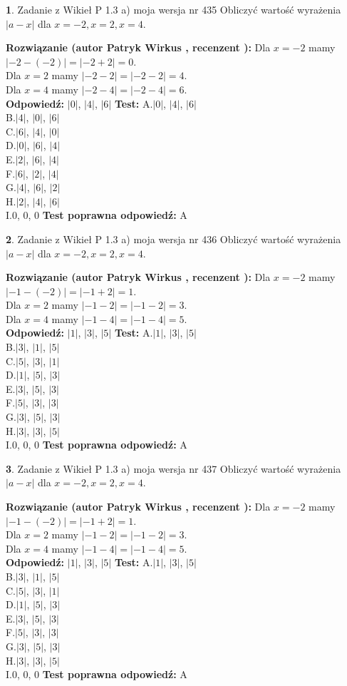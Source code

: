 \documentclass[12pt, a4paper]{article}
\theoremstyle{definition} %
\newtheorem{zad}{}
\newcommand{\zadStart}[1]{\begin{zad}#1\newline}
\newcommand{\zadStop}{\end{zad}}
\newcommand{\rozwStart}[2]{\noindent \textbf{Rozwiązanie (autor #1 , recenzent #2): }\newline}
\newcommand{\rozwStop}{\newline}
\newcommand{\odpStart}{\noindent \textbf{Odpowiedź:}\newline}
\newcommand{\odpStop}{\newline}
\newcommand{\testStart}{\noindent \textbf{Test:}\newline}
\newcommand{\testStop}{\newline}
\newcommand{\kluczStart}{\noindent \textbf{Test poprawna odpowiedź:}\newline}
\newcommand{\kluczStop}{\newline}
\begin{document}
\zadStart{Zadanie z Wikieł P 1.3 a) moja wersja nr 435}
Obliczyć wartość wyrażenia $|a - x|$ dla $x=-2,x=2,x=4$.
\zadStop
\rozwStart{Patryk Wirkus}{}
Dla $x = -2$ mamy $|-2 - (-2)| = |-2 + 2| = 0$.\\
Dla $x = 2$ mamy $|-2 - 2| = |-2 - 2| = 4$.\\
Dla $x = 4$ mamy $|-2 - 4| = |-2 - 4| = 6$.\\
\rozwStop
\odpStart
$|0|$, $|4|$, $|6|$
\odpStop
\testStart
A.$|0|$, $|4|$, $|6|$\\
B.$|4|$, $|0|$, $|6|$\\
C.$|6|$, $|4|$, $|0|$\\
D.$|0|$, $|6|$, $|4|$\\
E.$|2|$, $|6|$, $|4|$\\
F.$|6|$, $|2|$, $|4|$\\
G.$|4|$, $|6|$, $|2|$\\
H.$|2|$, $|4|$, $|6|$\\
I.$0$, $0$, $0$
\testStop
\kluczStart
A
\kluczStop



\zadStart{Zadanie z Wikieł P 1.3 a) moja wersja nr 436}
Obliczyć wartość wyrażenia $|a - x|$ dla $x=-2,x=2,x=4$.
\zadStop
\rozwStart{Patryk Wirkus}{}
Dla $x = -2$ mamy $|-1 - (-2)| = |-1 + 2| = 1$.\\
Dla $x = 2$ mamy $|-1 - 2| = |-1 - 2| = 3$.\\
Dla $x = 4$ mamy $|-1 - 4| = |-1 - 4| = 5$.\\
\rozwStop
\odpStart
$|1|$, $|3|$, $|5|$
\odpStop
\testStart
A.$|1|$, $|3|$, $|5|$\\
B.$|3|$, $|1|$, $|5|$\\
C.$|5|$, $|3|$, $|1|$\\
D.$|1|$, $|5|$, $|3|$\\
E.$|3|$, $|5|$, $|3|$\\
F.$|5|$, $|3|$, $|3|$\\
G.$|3|$, $|5|$, $|3|$\\
H.$|3|$, $|3|$, $|5|$\\
I.$0$, $0$, $0$
\testStop
\kluczStart
A
\kluczStop



\zadStart{Zadanie z Wikieł P 1.3 a) moja wersja nr 437}
Obliczyć wartość wyrażenia $|a - x|$ dla $x=-2,x=2,x=4$.
\zadStop
\rozwStart{Patryk Wirkus}{}
Dla $x = -2$ mamy $|-1 - (-2)| = |-1 + 2| = 1$.\\
Dla $x = 2$ mamy $|-1 - 2| = |-1 - 2| = 3$.\\
Dla $x = 4$ mamy $|-1 - 4| = |-1 - 4| = 5$.\\
\rozwStop
\odpStart
$|1|$, $|3|$, $|5|$
\odpStop
\testStart
A.$|1|$, $|3|$, $|5|$\\
B.$|3|$, $|1|$, $|5|$\\
C.$|5|$, $|3|$, $|1|$\\
D.$|1|$, $|5|$, $|3|$\\
E.$|3|$, $|5|$, $|3|$\\
F.$|5|$, $|3|$, $|3|$\\
G.$|3|$, $|5|$, $|3|$\\
H.$|3|$, $|3|$, $|5|$\\
I.$0$, $0$, $0$
\testStop
\kluczStart
A
\kluczStop
\end{document}
